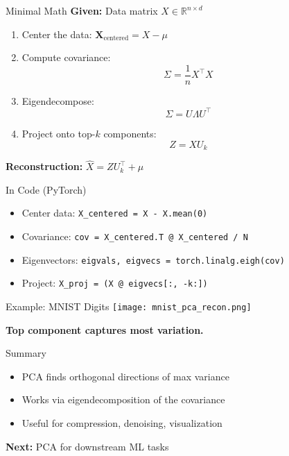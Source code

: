 \documentclass{beamer}
\begin{document}

\begin{frame}{Minimal Math}
\textbf{Given:} Data matrix \( X \in \mathbb{R}^{n \times d} \)

\begin{enumerate}
    \item Center the data: \( \mathbf{X}_{\text{centered}} = X - \mu \)
    \item Compute covariance: 
    \[
    \Sigma = \frac{1}{n} X^\top X
    \]
    \item Eigendecompose:
    \[
    \Sigma = U \Lambda U^\top
    \]
    \item Project onto top-\(k\) components:
    \[
    Z = X U_k
    \]
\end{enumerate}
\pause
\textbf{Reconstruction:} \( \hat{X} = Z U_k^\top + \mu \)
\end{frame}


\begin{frame}{In Code (PyTorch)}
\begin{itemize}
    \item Center data: \texttt{X\_centered = X - X.mean(0)}
    \item Covariance: \texttt{cov = X\_centered.T @ X\_centered / N}
    \item Eigenvectors: \texttt{eigvals, eigvecs = torch.linalg.eigh(cov)}
    \item Project: \texttt{X\_proj = (X @ eigvecs[:, -k:])}
\end{itemize}
\end{frame}


\begin{frame}{Example: MNIST Digits}
\centering
\texttt{[image: mnist\_pca\_recon.png]} %
\vspace{1em}

\textbf{Top component captures most variation.}
\end{frame}


\begin{frame}{Summary}
\begin{itemize}
    \item PCA finds orthogonal directions of max variance
    \item Works via eigendecomposition of the covariance
    \item Useful for compression, denoising, visualization
\end{itemize}
\pause
\vspace{1em}
\textbf{Next:} PCA for downstream ML tasks
\end{frame}
\end{document}
